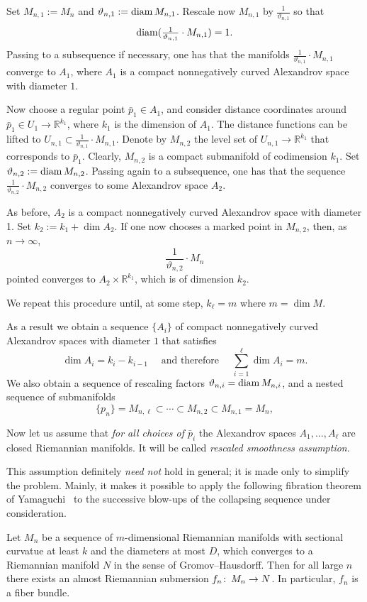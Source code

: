 \documentclass{amsart}
\begin{document}
Set $M_{n,1}:=M_n$ and $\vartheta_{n,1}:=\operatorname{\rm diam} M_{n,1}$.
Rescale now $M_{n,1}$ by $\tfrac{1}{\vartheta_{n,1}}$
so that 
\[\operatorname{\rm diam}(\tfrac{1}{\vartheta_{n,1}}\cdot M_{n,1})=1.\]
Passing to a subsequence if necessary, one has
that the manifolds $\frac{1}{\vartheta_{n,1}}{\cdot} M_{n,1}$
converge to $A_1$,
where $A_1$
is a compact nonnegatively curved Alexandrov space with diameter $1$.

Now choose a regular point $\bar p_1\in A_1$,
and consider distance coordinates around $\bar p_1\in U_1\to \mathbb{R}^{k_1}$,
where $k_1$ is the dimension of $A_1$.
The distance functions can be lifted
to $U_{n,1}\subset \frac{1}{\vartheta_{n,1}}{\cdot} M_{n,1}$.
Denote by $M_{n,2}$ the level set of $U_{n,1}\to \mathbb{R}^{k_1}$ that corresponds to $\bar p_1$.
Clearly, $M_{n,2}$ is a compact submanifold of codimension $k_1$.
Set $\vartheta_{n,2}:=\operatorname{\rm diam} M_{n,2}$.
Passing again to a subsequence, one has
that the sequence $\frac{1}{\vartheta_{n,2}}{\cdot} M_{n,2}$
converges to some  Alexandrov space $A_2$.

As before, $A_2$ is a compact nonnegatively curved Alexandrov space with diameter 1.
Set $k_2:=k_1+\dim A_2$.
If one now chooses a marked point in $M_{n,2}$,
then, as $n\to\infty$,
$$\frac{1}{\vartheta_{n,2}}{\cdot} M_{n}$$ pointed converges to $A_2\times\mathbb{R}^{k_1}$,
which is of dimension $k_2$.

We repeat this procedure until, at some step, $k_\ell=m$ where $m=\dim M$.

\medskip

As a result we obtain a sequence $\{A_i\}$ of compact nonnegatively curved Alexandrov spaces
with diameter $1$ that satisfies
$$\dim A_i=k_i-k_{i-1} 
\quad\text{ and therefore }\quad
\sum_{i=1}^\ell\dim A_i=m.$$
We also obtain
a sequence of rescaling factors $\vartheta_{n,i}=\operatorname{\rm diam} M_{n,i}$,
and  a nested sequence of submanifolds
$$\{p_n\}=M_{n,\ell}\subset \cdots \subset M_{n,2}\subset M_{n,1}=M_n,$$

Now let us assume that \emph{for all choices of $\bar p_i$}
the Alexandrov spaces $A_1,\dots, A_\ell$ are closed  Riemannian manifolds.
It will be called \emph{rescaled smoothness assumption}.

This assumption definitely \emph{need not} hold in general;
it is made only to simplify the problem.
Mainly, it makes it possible to apply the following fibration theorem of Yamaguchi~\cite{Yam} to the successive blow-ups of the collapsing sequence under consideration.

\begin{thm}
Let $M_n$ be a sequence of $m$-dimensional Riemannian manifolds with sectional curvatue at least $k$ and the diameters at most $D$, which converges to a Riemannian manifold $N$ in the sense of Gromov--Hausdorff.
Then for all large $n$ there exists an almost Riemannian submersion $f_n\colon\thinspace M_n\to N$.
In particular, $f_n$ is a fiber bundle.
\end{thm}
\end{document}
